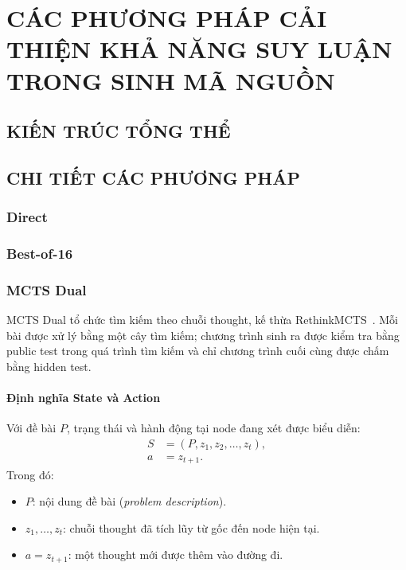 \chapter{CÁC PHƯƠNG PHÁP CẢI THIỆN KHẢ NĂNG SUY LUẬN TRONG SINH MÃ NGUỒN}
\label{chap:caidat}

\section{KIẾN TRÚC TỔNG THỂ}

\section{CHI TIẾT CÁC PHƯƠNG PHÁP}
\subsection{Direct}
\subsection{Best-of-16}
\subsection{MCTS Dual}
\label{sec:mcts-dual-thuat-toan}
MCTS Dual tổ chức tìm kiếm theo chuỗi thought, kế thừa RethinkMCTS~\cite{li2024rethinkmcts}. Mỗi bài được xử lý bằng một cây tìm kiếm; chương trình sinh ra được kiểm tra bằng public test trong quá trình tìm kiếm và chỉ chương trình cuối cùng được chấm bằng hidden test.

\subsubsection{Định nghĩa State và Action}
Với đề bài $P$, trạng thái và hành động tại node đang xét được biểu diễn:
\[
  \begin{aligned}
    S &= (P,z_1,z_2,\ldots,z_t),\\
    a &= z_{t+1}.
  \end{aligned}
\]
Trong đó:
\begin{itemize}
  \item $P$: nội dung đề bài (\emph{problem description}).
  \item $z_1,\ldots,z_t$: chuỗi thought đã tích lũy từ gốc đến node hiện tại.
  \item $a=z_{t+1}$: một thought mới được thêm vào đường đi.
\end{itemize}

